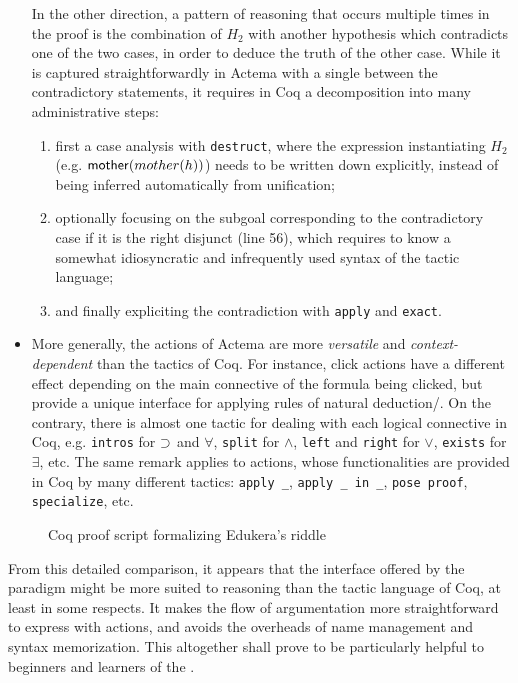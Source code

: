 \begin{itemize}
  In the other direction, a pattern of reasoning that occurs multiple times in
  the proof is the combination of $H_2$ with another hypothesis which
  contradicts one of the two cases, in order to deduce the truth of the other
  case. While it is captured straightforwardly in Actema with a single 
  between the contradictory statements, it requires in Coq a decomposition into
  many administrative steps:
  \begin{enumerate}
    \item first a case analysis with \texttt{destruct}, where the expression
    instantiating $H_2$ (e.g. $\mbox{\textsf{mother}}(mother(h))$) needs to be written down
    explicitly, instead of being inferred automatically from unification;
    \item optionally focusing on the subgoal corresponding to the contradictory
    case if it is the right disjunct (line 56), which requires to know a
    somewhat idiosyncratic and infrequently used syntax of the tactic language;
    \item and finally expliciting the contradiction with \texttt{apply} and
    \texttt{exact}.
  \end{enumerate}

  \item More generally, the actions of Actema are more \emph{versatile} and
  \emph{context-dependent} than the tactics of Coq. For instance, click actions
  have a different effect depending on the main connective of the formula being
  clicked, but provide a unique interface for applying rules of natural
  deduction/. On the contrary, there is almost one tactic for
  dealing with each logical connective in Coq, e.g. \texttt{intros} for $\supset$
  and $\forall$, \texttt{split} for $\land$, \texttt{left} and \texttt{right}
  for $\lor$, \texttt{exists} for $\exists$, etc. The same remark applies to 
  actions, whose functionalities are provided in Coq by many different tactics:
  \texttt{apply \_}, \texttt{apply \_ in \_}, \texttt{pose proof},
  \texttt{specialize}, etc.
\end{itemize}

\begin{figure}
  
  \caption{Coq proof script formalizing Edukera's riddle}
\end{figure}

From this detailed comparison, it appears that the interface offered by the
 paradigm might be more suited to  reasoning than the
tactic language of Coq, at least in some respects. It makes the flow of
argumentation more straightforward to express with  actions, and avoids the
overheads of name management and syntax memorization. This altogether shall
prove to be particularly helpful to beginners and learners of the .


